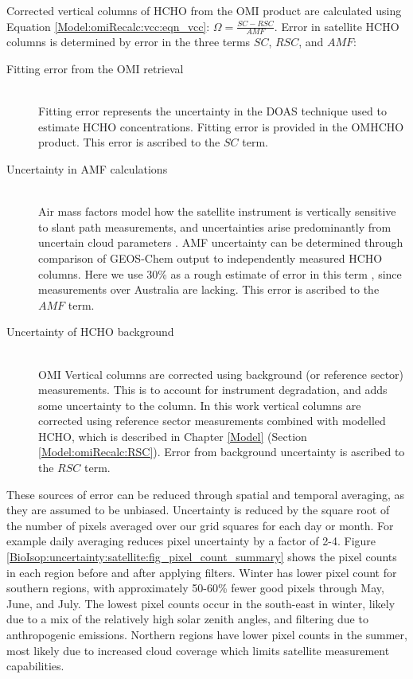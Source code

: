     Corrected vertical columns of HCHO from the OMI product are calculated using Equation \ref{Model:omiRecalc:vcc:eqn_vcc}:
    $\Omega = \frac{SC - RSC}{AMF}$.
    Error in satellite HCHO columns is determined by error in the three terms $SC$, $RSC$, and $AMF$:
    \begin{description}
      \item [Fitting error from the OMI retrieval] \hfill \\
        Fitting error represents the uncertainty in the DOAS technique used to estimate HCHO concentrations.
        Fitting error is provided in the OMHCHO product.
        This error is ascribed to the $SC$ term.
      \item [Uncertainty in AMF calculations] \hfill \\
        Air mass factors model how the satellite instrument is vertically sensitive to slant path measurements, and uncertainties arise predominantly from uncertain cloud parameters \parencite{Palmer2006}.
        AMF uncertainty can be determined through comparison of GEOS-Chem output to independently measured HCHO columns.
        Here we use 30\% as a rough estimate of error in this term \parencite{Palmer2006}, since measurements over Australia are lacking.
        This error is ascribed to the $AMF$ term.
      \item [Uncertainty of HCHO background] \hfill \\
        OMI Vertical columns are corrected using background (or reference sector) measurements.
        This is to account for instrument degradation, and adds some uncertainty to the column.
        In this work vertical columns are corrected using reference sector measurements combined with modelled HCHO, which is described in Chapter \ref{Model} (Section \ref{Model:omiRecalc:RSC}).
        Error from background uncertainty is ascribed to the $RSC$ term.
    \end{description}
    These sources of error can be reduced through spatial and temporal averaging, as they are assumed to be unbiased.
    Uncertainty is reduced by the square root of the number of pixels averaged over our \lowhr grid squares for each day or month.
    For example daily averaging reduces pixel uncertainty by a factor of 2-4.
    Figure \ref{BioIsop:uncertainty:satellite:fig_pixel_count_summary} shows the pixel counts in each region before and after applying filters.
    Winter has lower pixel count for southern regions, with approximately 50-60\% fewer good pixels through May, June, and July.
    The lowest pixel counts occur in the south-east in winter, likely due to a mix of the relatively high solar zenith angles, and filtering due to anthropogenic emissions.
    Northern regions have lower pixel counts in the summer, most likely due to increased cloud coverage which limits satellite measurement capabilities.
    
